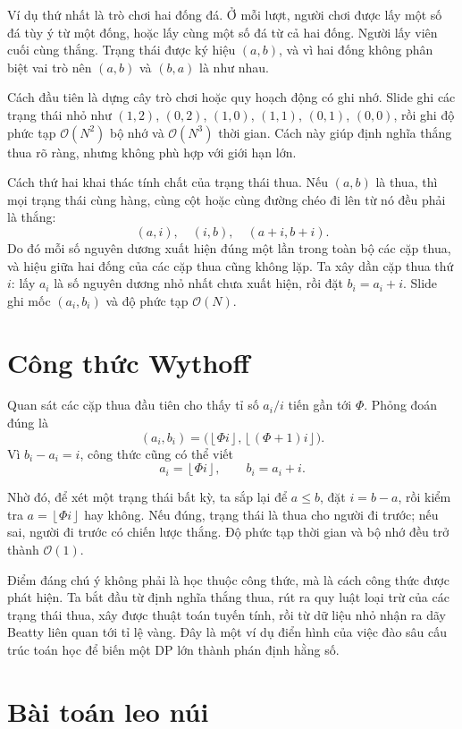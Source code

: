\documentclass[11pt]{article}
\newcommand{\Oh}{\mathcal{O}}
\newcommand{\floor}[1]{\left\lfloor #1\right\rfloor}
\begin{document}
Ví dụ thứ nhất là trò chơi hai đống đá. Ở mỗi lượt, người chơi được lấy một
số đá tùy ý từ một đống, hoặc lấy cùng một số đá từ cả hai đống. Người lấy
viên cuối cùng thắng. Trạng thái được ký hiệu \((a,b)\), và vì hai đống không
phân biệt vai trò nên \((a,b)\) và \((b,a)\) là như nhau.

Cách đầu tiên là dựng cây trò chơi hoặc quy hoạch động có ghi nhớ. Slide ghi
các trạng thái nhỏ như \((1,2)\), \((0,2)\), \((1,0)\), \((1,1)\), \((0,1)\),
\((0,0)\), rồi ghi độ phức tạp \(\Oh(N^2)\) bộ nhớ và \(\Oh(N^3)\) thời gian.
Cách này giúp định nghĩa thắng thua rõ ràng, nhưng không phù hợp với giới hạn
lớn.

Cách thứ hai khai thác tính chất của trạng thái thua. Nếu \((a,b)\) là thua,
thì mọi trạng thái cùng hàng, cùng cột hoặc cùng đường chéo đi lên từ nó đều
phải là thắng:
\[
  (a,i),\quad (i,b),\quad (a+i,b+i).
\]
Do đó mỗi số nguyên dương xuất hiện đúng một lần trong toàn bộ các cặp thua,
và hiệu giữa hai đống của các cặp thua cũng không lặp. Ta xây dần cặp thua
thứ \(i\): lấy \(a_i\) là số nguyên dương nhỏ nhất chưa xuất hiện, rồi đặt
\(b_i=a_i+i\). Slide ghi mốc \((a_i,b_i)\) và độ phức tạp \(\Oh(N)\).

\section{Công thức Wythoff}

Quan sát các cặp thua đầu tiên cho thấy tỉ số \(a_i/i\) tiến gần tới
\(\Phi\). Phỏng đoán đúng là
\[
  (a_i,b_i)=
  \bigl(\floor{\Phi i},\floor{(\Phi+1)i}\bigr).
\]
Vì \(b_i-a_i=i\), công thức cũng có thể viết
\[
  a_i=\floor{\Phi i},\qquad b_i=a_i+i.
\]

Nhờ đó, để xét một trạng thái bất kỳ, ta sắp lại để \(a\le b\), đặt
\(i=b-a\), rồi kiểm tra \(a=\floor{\Phi i}\) hay không. Nếu đúng, trạng thái
là thua cho người đi trước; nếu sai, người đi trước có chiến lược thắng. Độ
phức tạp thời gian và bộ nhớ đều trở thành \(\Oh(1)\).

Điểm đáng chú ý không phải là học thuộc công thức, mà là cách công thức được
phát hiện. Ta bắt đầu từ định nghĩa thắng thua, rút ra quy luật loại trừ của
các trạng thái thua, xây được thuật toán tuyến tính, rồi từ dữ liệu nhỏ nhận
ra dãy Beatty liên quan tới tỉ lệ vàng. Đây là một ví dụ điển hình của việc
đào sâu cấu trúc toán học để biến một DP lớn thành phán định hằng số.

\section{Bài toán leo núi}
\end{document}
